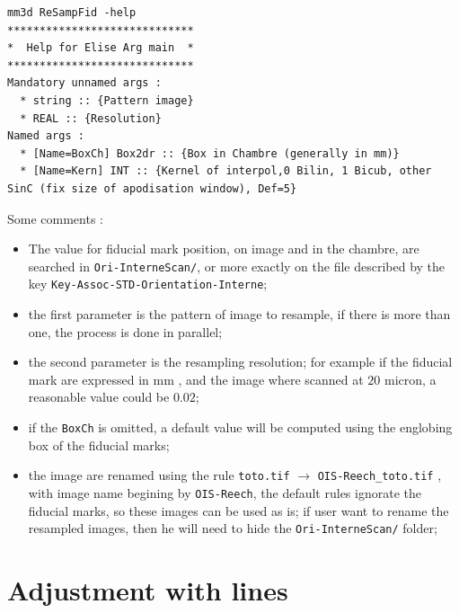\begin{verbatim}
mm3d ReSampFid -help
*****************************
*  Help for Elise Arg main  *
*****************************
Mandatory unnamed args : 
  * string :: {Pattern image}
  * REAL :: {Resolution}
Named args : 
  * [Name=BoxCh] Box2dr :: {Box in Chambre (generally in mm)}
  * [Name=Kern] INT :: {Kernel of interpol,0 Bilin, 1 Bicub, other SinC (fix size of apodisation window), Def=5}
\end{verbatim}

Some comments :

\begin{itemize}
   \item  The value for fiducial mark position, on image and in the chambre, are searched in {\tt Ori-InterneScan/},
          or more exactly on the file described by the key {\tt Key-Assoc-STD-Orientation-Interne};

   \item the first parameter is the pattern of image to resample, if there is more than one, the process is done in parallel;

   \item the second parameter is the resampling resolution; for example if the fiducial mark are expressed in mm , and the
         image where scanned at $20$ micron, a reasonable value could be $0.02$;

   \item if the {\tt BoxCh} is omitted, a default value will be computed using the englobing box of the fiducial marks;

   \item the image are renamed using the rule {\tt toto.tif} $\rightarrow$  {\tt OIS-Reech\_toto.tif} , with
         image name begining by {\tt OIS-Reech},  the  default rules ignorate the fiducial marks, so these images
         can be used as is; if user want to rename the resampled images, then he will need to hide the
         {\tt Ori-InterneScan/} folder;

\end{itemize}



\section{Adjustment with lines} \label{Adjustment with lines}




